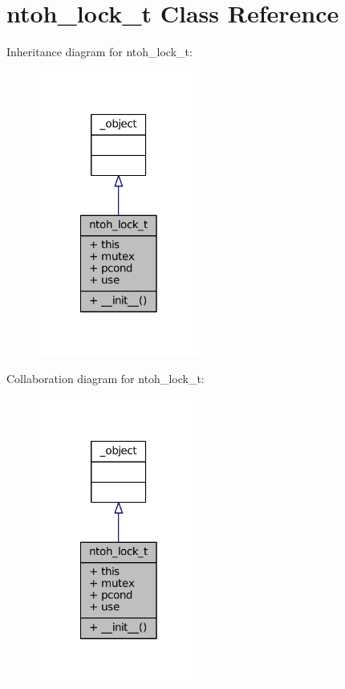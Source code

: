 \hypertarget{classlibntoh_1_1ntoh__lock__t}{\section{ntoh\-\_\-lock\-\_\-t Class Reference}
\label{classlibntoh_1_1ntoh__lock__t}
}


Inheritance diagram for ntoh\-\_\-lock\-\_\-t\-:
\nopagebreak
\begin{figure}[H]
\begin{center}
\leavevmode
\includegraphics[width=150pt]{classlibntoh_1_1ntoh__lock__t__inherit__graph}
\end{center}
\end{figure}


Collaboration diagram for ntoh\-\_\-lock\-\_\-t\-:
\nopagebreak
\begin{figure}[H]
\begin{center}
\leavevmode
\includegraphics[width=150pt]{classlibntoh_1_1ntoh__lock__t__coll__graph}
\end{center}
\end{figure}
